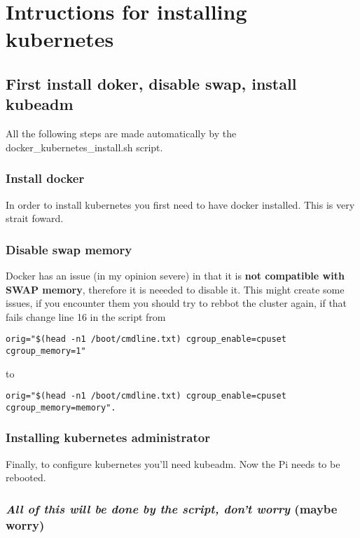 \section{Intructions for installing kubernetes}

\subsection{First install doker, disable swap, install kubeadm}

All the following steps are made automatically by the
docker\_kubernetes\_install.sh script.

\subsubsection{Install docker}

In order to install kubernetes you first need to have docker installed.
This is very strait foward.

\subsubsection{Disable swap memory}

Docker has an issue (in my opinion severe) in that it is \textbf{not
compatible with SWAP memory}, therefore it is neeeded to disable it.
This might create some issues, if you encounter them you should try to
rebbot the cluster again, if that fails change line 16 in the script
from

\begin{lstlisting}
orig="$(head -n1 /boot/cmdline.txt) cgroup_enable=cpuset cgroup_memory=1"
\end{lstlisting}

to

\begin{lstlisting}
orig="$(head -n1 /boot/cmdline.txt) cgroup_enable=cpuset cgroup_memory=memory".
\end{lstlisting}

\subsubsection{Installing kubernetes administrator}

Finally, to configure kubernetes you'll need kubeadm. Now the Pi needs
to be rebooted.

\subsubsection{\texorpdfstring{\emph{All of this will be done by the script, don't worry} (maybe worry)}{All of this will be done by the script, don't worry (maybe worry)}}

